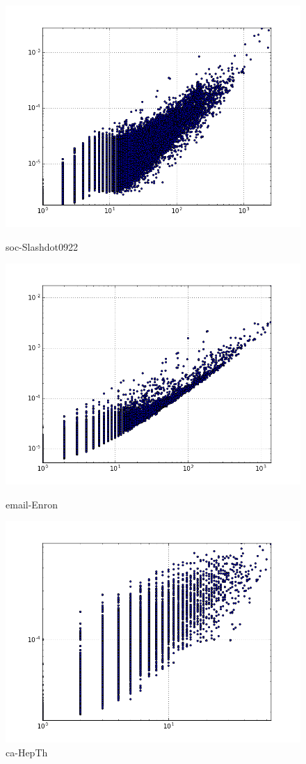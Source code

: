 \begin{figure}[H]
  \includegraphics[width=\linewidth]{img/slashDot09/degreeVSpagerank.png}
  \caption*{soc-Slashdot0922}
\endminipage\hfill
{}
  \includegraphics[width=\linewidth]{img/email/degreeVSpagerank.png}
  \caption*{email-Enron}
\endminipage\hfill
{}
  \includegraphics[width=\linewidth]{img/ca-HepTh/degreeVSpagerank.png}
  \caption*{ca-HepTh}
\endminipage
\end{figure}
